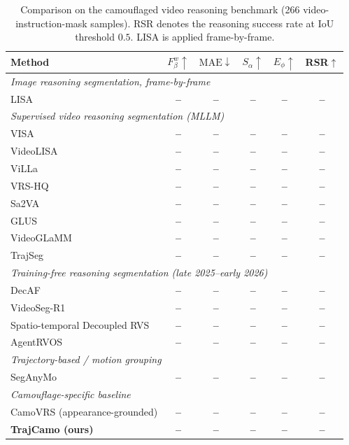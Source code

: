 \documentclass[11pt]{article}
\newcommand{\TBD}{\textcolor{red!70!black}{\textbf{--}}}
\begin{document}
\begin{table}[t]
\centering
\caption{Comparison on the camouflaged video reasoning benchmark (266 video-instruction-mask samples). RSR denotes the reasoning success rate at IoU threshold $0.5$. LISA is applied frame-by-frame.}
\label{tab:camovrs}
\small
\setlength{\tabcolsep}{4pt}
\begin{tabular}{lccccc}
\toprule
Method & $F^w_\beta\uparrow$ & $\mathrm{MAE}\downarrow$ & $S_\alpha\uparrow$ & $E_\phi\uparrow$ & RSR$\uparrow$ \\
\midrule
\multicolumn{6}{l}{\emph{Image reasoning segmentation, frame-by-frame}} \\
LISA~\cite{lisa}                & \TBD & \TBD & \TBD & \TBD & \TBD \\
\midrule
\multicolumn{6}{l}{\emph{Supervised video reasoning segmentation (MLLM)}} \\
VISA~\cite{visa}                & \TBD & \TBD & \TBD & \TBD & \TBD \\
VideoLISA~\cite{videolisa}      & \TBD & \TBD & \TBD & \TBD & \TBD \\
ViLLa~\cite{villa}              & \TBD & \TBD & \TBD & \TBD & \TBD \\
VRS-HQ~\cite{vrshq}             & \TBD & \TBD & \TBD & \TBD & \TBD \\
Sa2VA~\cite{sa2va}              & \TBD & \TBD & \TBD & \TBD & \TBD \\
GLUS~\cite{glus}                & \TBD & \TBD & \TBD & \TBD & \TBD \\
VideoGLaMM~\cite{videoglamm}    & \TBD & \TBD & \TBD & \TBD & \TBD \\
TrajSeg~\cite{trajseg}          & \TBD & \TBD & \TBD & \TBD & \TBD \\
\midrule
\multicolumn{6}{l}{\emph{Training-free reasoning segmentation (late 2025--early 2026)}} \\
DecAF~\cite{decaf}              & \TBD & \TBD & \TBD & \TBD & \TBD \\
VideoSeg-R1~\cite{videosegr1}   & \TBD & \TBD & \TBD & \TBD & \TBD \\
Spatio-temporal Decoupled RVS~\cite{stdec} & \TBD & \TBD & \TBD & \TBD & \TBD \\
AgentRVOS~\cite{agentrvos}      & \TBD & \TBD & \TBD & \TBD & \TBD \\
\midrule
\multicolumn{6}{l}{\emph{Trajectory-based / motion grouping}} \\
SegAnyMo~\cite{seganymo}        & \TBD & \TBD & \TBD & \TBD & \TBD \\
\midrule
\multicolumn{6}{l}{\emph{Camouflage-specific baseline}} \\
CamoVRS (appearance-grounded)   & \TBD & \TBD & \TBD & \TBD & \TBD \\
\midrule
\textbf{TrajCamo (ours)}        & \TBD & \TBD & \TBD & \TBD & \TBD \\
\bottomrule
\end{tabular}
\end{table}
\end{document}
